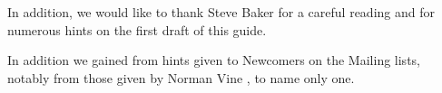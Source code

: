 In addition, we would like to thank Steve Baker for a careful reading and for numerous hints on the first
draft of this guide.

In addition we gained from hints given to Newcomers on the Mailing lists, notably from
those given by Norman Vine , to name only one.


